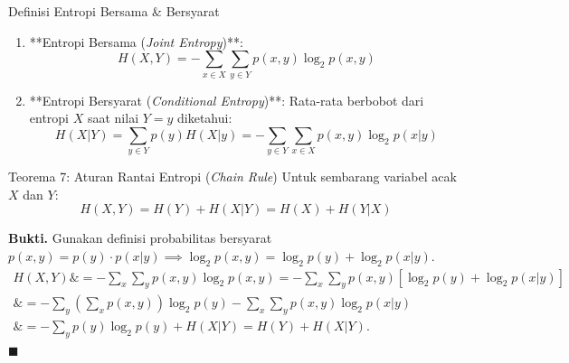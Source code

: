 \documentclass[11pt,a4paper]{article}
\newenvironment{proof}{\noindent\textbf{Bukti.}}{\hfill$\blacksquare$\vspace{0.3em}}
\begin{document}
\begin{conceptbox}{Definisi Entropi Bersama \& Bersyarat}
\begin{enumerate}
    \item **Entropi Bersama (\textit{Joint Entropy})**:
    \begin{equation}
    \label{eq:joint_entropy}
    H(X, Y) = - \sum_{x \in X} \sum_{y \in Y} p(x, y) \log_2 p(x, y)
    \end{equation}
    \item **Entropi Bersyarat (\textit{Conditional Entropy})**:
    Rata-rata berbobot dari entropi $X$ saat nilai $Y=y$ diketahui:
    \begin{equation}
    \label{eq:conditional_entropy}
    H(X|Y) = \sum_{y \in Y} p(y) H(X|y) = - \sum_{y \in Y} \sum_{x \in X} p(x, y) \log_2 p(x|y)
    \end{equation}
\end{enumerate}
\end{conceptbox}

\begin{thmbox}{Teorema 7: Aturan Rantai Entropi (\textit{Chain Rule})}
Untuk sembarang variabel acak $X$ dan $Y$:
\begin{equation}
\label{eq:chain_rule}
H(X, Y) = H(Y) + H(X|Y) = H(X) + H(Y|X)
\end{equation}
\end{thmbox}
\begin{proof}
Gunakan definisi probabilitas bersyarat $p(x, y) = p(y) \cdot p(x|y) \implies \log_2 p(x,y) = \log_2 p(y) + \log_2 p(x|y)$.
\begin{align*}
H(X, Y) \&= - \sum_{x} \sum_{y} p(x, y) \log_2 p(x, y) = - \sum_{x} \sum_{y} p(x, y) \left[ \log_2 p(y) + \log_2 p(x|y) \right] \\
\&= - \sum_{y} \left( \sum_{x} p(x, y) \right) \log_2 p(y) - \sum_{x} \sum_{y} p(x, y) \log_2 p(x|y) \\
\&= - \sum_{y} p(y) \log_2 p(y) + H(X|Y) = H(Y) + H(X|Y). 
\end{align*}
\end{proof}
\end{document}
